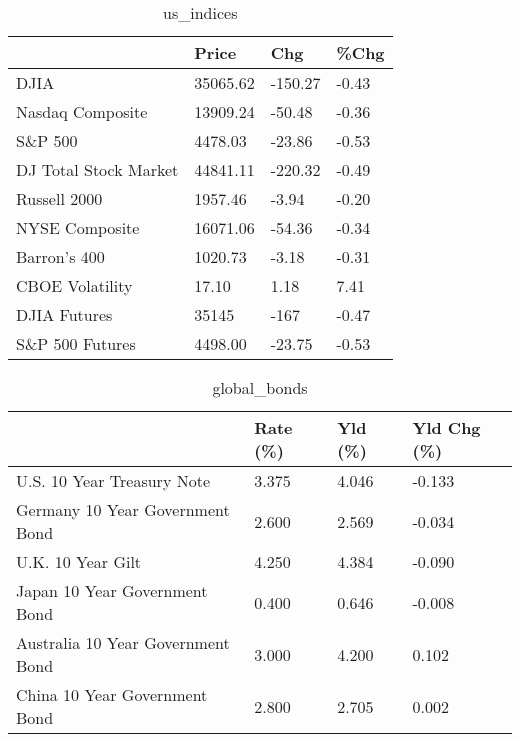 \documentclass{article}%
\begin{document}
%


\begin{table}[htbp]%
\caption{us\_indices}%
\centering%
\begin{adjustbox}{width=1\textwidth}%
\begin{tabular}{llll}
\toprule
                      &    Price &     Chg &  \%Chg \\
\midrule
                 DJIA & 35065.62 & -150.27 & -0.43 \\
     Nasdaq Composite & 13909.24 &  -50.48 & -0.36 \\
              S\&P 500 &  4478.03 &  -23.86 & -0.53 \\
DJ Total Stock Market & 44841.11 & -220.32 & -0.49 \\
         Russell 2000 &  1957.46 &   -3.94 & -0.20 \\
       NYSE Composite & 16071.06 &  -54.36 & -0.34 \\
         Barron's 400 &  1020.73 &   -3.18 & -0.31 \\
      CBOE Volatility &    17.10 &    1.18 &  7.41 \\
         DJIA Futures &    35145 &    -167 & -0.47 \\
      S\&P 500 Futures &  4498.00 &  -23.75 & -0.53 \\
\bottomrule
\end{tabular}
%
\end{adjustbox}%
\end{table}

%


\begin{table}[htbp]%
\caption{global\_bonds}%
\centering%
\begin{adjustbox}{width=1\textwidth}%
\begin{tabular}{llll}
\toprule
                                  & Rate (\%) & Yld (\%) & Yld Chg (\%) \\
\midrule
       U.S. 10 Year Treasury Note &    3.375 &   4.046 &      -0.133 \\
  Germany 10 Year Government Bond &    2.600 &   2.569 &      -0.034 \\
                U.K. 10 Year Gilt &    4.250 &   4.384 &      -0.090 \\
    Japan 10 Year Government Bond &    0.400 &   0.646 &      -0.008 \\
Australia 10 Year Government Bond &    3.000 &   4.200 &       0.102 \\
    China 10 Year Government Bond &    2.800 &   2.705 &       0.002 \\
\bottomrule
\end{tabular}
%
\end{adjustbox}%
\end{table}
\end{document}
